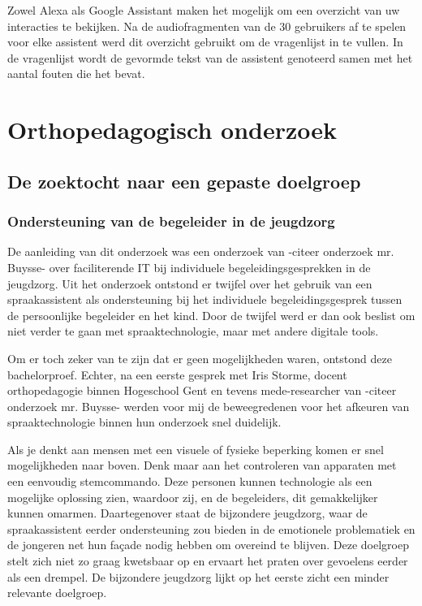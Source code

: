 Zowel Alexa als Google Assistant maken het mogelijk om een overzicht van uw interacties te bekijken. Na de audiofragmenten van de 30 gebruikers af te spelen voor elke assistent werd dit overzicht gebruikt om de vragenlijst in te vullen. In de vragenlijst wordt de gevormde tekst van de assistent genoteerd samen met het aantal fouten die het bevat.

\section{Orthopedagogisch onderzoek}
\label{Orthopedagogisch onderzoek}
\subsection{De zoektocht naar een gepaste doelgroep}
\label{De zoektocht naar een gepaste doelgroep}

\subsubsection{Ondersteuning van de begeleider in de jeugdzorg}
\label{ondersteuning van de begeleider in de jeugdzorg}
De aanleiding van dit onderzoek was een onderzoek van -citeer onderzoek mr. Buysse- over faciliterende IT bij individuele begeleidingsgesprekken in de jeugdzorg. Uit het onderzoek ontstond er twijfel over het gebruik van een spraakassistent als ondersteuning bij het individuele begeleidingsgesprek tussen de persoonlijke begeleider en het kind. Door de twijfel werd er dan ook beslist om niet verder te gaan met spraaktechnologie, maar met andere digitale tools.

Om er toch zeker van te zijn dat er geen mogelijkheden waren, ontstond deze bachelorproef. Echter, na een eerste gesprek met Iris Storme, docent orthopedagogie binnen Hogeschool Gent en tevens mede-researcher van -citeer onderzoek mr. Buysse- werden voor mij de beweegredenen voor het afkeuren van spraaktechnologie binnen hun onderzoek snel duidelijk. 

Als je denkt aan mensen met een visuele of fysieke beperking komen er snel mogelijkheden naar boven. Denk maar aan het controleren van apparaten met een eenvoudig stemcommando. Deze personen kunnen technologie als een mogelijke oplossing zien, waardoor zij, en de begeleiders, dit gemakkelijker kunnen omarmen.
Daartegenover staat de bijzondere jeugdzorg, waar de spraakassistent eerder ondersteuning zou bieden in de emotionele problematiek en de jongeren net hun façade nodig hebben om overeind te blijven. Deze doelgroep stelt zich niet zo graag kwetsbaar op en ervaart het praten over gevoelens eerder als een drempel. De bijzondere jeugdzorg lijkt op het eerste zicht een minder relevante doelgroep.

